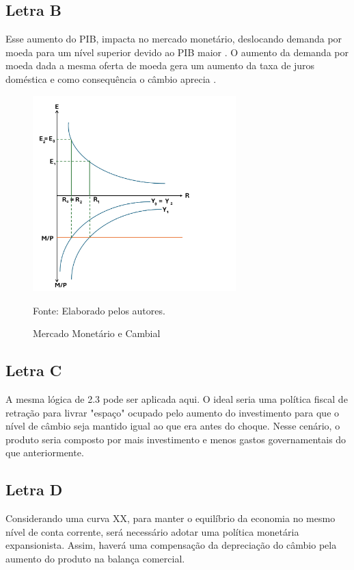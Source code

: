 \documentclass[a4paper,12pt]{article}[abntex2]
\begin{document}
\subsection{\textbf{Letra B}}

 Esse aumento do PIB, impacta no mercado monetário, deslocando demanda por moeda para um nível superior devido ao PIB maior . O aumento da demanda por moeda dada a mesma oferta de moeda gera um aumento da taxa de juros doméstica  e como consequência o câmbio aprecia .

 \begin{figure}[H]
    \centering
    \caption{Mercado Monetário e Cambial} 
    \includegraphics[width=0.7\textwidth]{4º Período/Macroeconomia Internacional/APS 4 Macro Int/Merc. Mont L(b).png}
    \label{fig:Moeda Lb}
    
    \footnotesize{Fonte: Elaborado pelos autores.}
    \end{figure}

\subsection{\textbf{Letra C}}

A mesma lógica de 2.3 pode ser aplicada aqui. O ideal seria uma política fiscal de retração para livrar "espaço" ocupado pelo aumento do investimento para que o nível de câmbio seja mantido igual ao que era antes do choque. Nesse cenário, o produto seria composto por mais investimento e menos gastos governamentais do que anteriormente.

\subsection{\textbf{Letra D}}
 Considerando uma curva XX, para manter o equilíbrio da economia no mesmo nível de conta corrente, será necessário adotar uma política monetária expansionista. Assim, haverá uma compensação da depreciação do câmbio pela aumento do produto na balança comercial.
\end{document}
